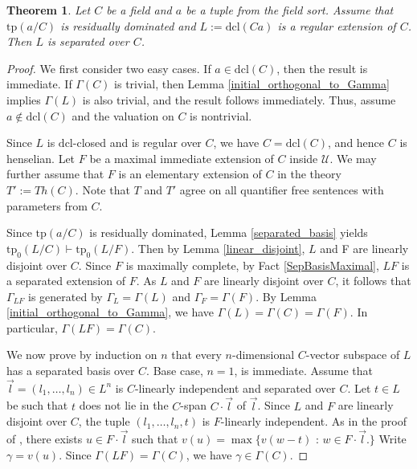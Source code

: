 \documentclass[12pt]{article}
\newcommand{\tpp}{\mathrm{tp}}
\newcommand{\acl}{\mathrm{acl}}
\newcommand{\dcl}{\mathrm{dcl}}
\newcommand{\alg}{\mathrm{alg}}
\newcommand{\val}{\textit{v}}
\newcommand{\0}{\emptyset}
\newcommand{\U}{\mathcal{U}}
\def\forkindep{\mathrel{\raise0.2ex\hbox{\ooalign{\hidewidth$\vert$\hidewidth\cr\raise-0.9ex\hbox{$\smile$}}}}}
\theoremstyle{plain}%
\newtheorem{thm}{Theorem}[section]
\theoremstyle{definition}
\theoremstyle{remark}
\begin{document}
\begin{thm} \label{resdom_implies_separated_basis}
    Let $C$ be a field and $a$ be a tuple from the field sort. Assume that $\tpp(a/C)$ is residually dominated and $L:=\dcl(Ca)$ is a regular extension of $C$. Then $L$ is separated over $C$.
\end{thm}
\begin{proof} 
We first consider two easy cases. If  $a\in \dcl(C)$, then the result is immediate. If $\Gamma(C)$ is trivial, then Lemma \ref{initial_orthogonal_to_Gamma} implies $\Gamma(L)$ is also trivial, and the result follows immediately. Thus, assume $a\not\in \dcl(C)$ and the valuation on $C$ is nontrivial.

Since $L$ is $\dcl$-closed and is regular over $C$, we have $C=\dcl(C)$, and hence $C$ is henselian.
Let $F$ be a maximal immediate extension of $C$ inside $\U$. 
We may further assume that $F$ is an elementary extension of $C$ in the theory $T':=Th(C)$. Note that $T$ and $T'$ agree on  all quantifier free sentences with parameters from $C$.


Since $\tpp(a/C)$ is residually dominated, Lemma \ref{separated_basis} yields $\tpp_0(L/C) \vdash \tpp_0(L/F)$. Then by Lemma \ref{linear_disjoint}, $L$ and F are linearly disjoint over $C$. Since $F$ is maximally complete, by Fact \ref{SepBasisMaximal}, $LF$ is a separated extension of $F$. As $L$ and $F$ are linearly disjoint over $C$, it follows that $\Gamma_{LF}$ is generated by $\Gamma_L = \Gamma(L)$ and $\Gamma_F = \Gamma(F)$. By Lemma \ref{initial_orthogonal_to_Gamma}, we have $\Gamma(L) = \Gamma(C) = \Gamma(F)$. In particular, $\Gamma(LF)=\Gamma(C)$. %

We now prove by induction on $n$ that every $n$-dimensional $C$-vector subspace of $L$ has a separated basis  over $C$. 
Base case, $n = 1$, is immediate. 
Assume that $\vec{l} = (l_1, \dots, l_n) \in L^n$ is $C$-linearly independent and separated over $C$. 
Let $t \in L$ be such that $t$ does not lie in the $C$-span $ C \cdot \vec{l}$ of $\vec{l}$. 
Since $L$ and $F$ are linearly disjoint over $C$, the tuple $(l_1, \dots, l_{n},t)$ is $F$-linearly independent. 
As in the proof of \cite[Proposition 12.1]{HHM08}, there exists $u \in F \cdot \vec{l}$ such that $\val(u) = \max \{ \val(w - t) \text{ : } w \in F \cdot \vec{l}.\}$ Write $\gamma=\val(u)$. Since $\Gamma(LF)=\Gamma(C)$, we have $\gamma\in \Gamma(C)$.



\end{proof}
\end{document}
